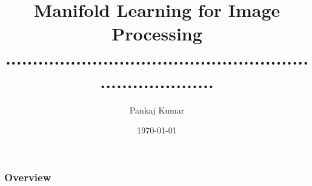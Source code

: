 \documentclass{beamer}
\title[Short title]{{\Huge{Manifold Learning for Image Processing}} \\ .............................................................................\\} %
\author{Pankaj Kumar} %
\institute[MIPT] %
{
Moscow Institute of Physics and Technology\\ %
\medskip
\textit{kumar.x.pankaj@gmail.com} %
}
\date{\today} %
\theoremstyle{plain}
\theoremstyle{definition}
\theoremstyle{plain}
\theoremstyle{plain}
\begin{document}
\begin{frame}
\titlepage %
\end{frame}

\begin{frame}
\frametitle{Overview} %
\tableofcontents %
\end{frame}

\end{document}
